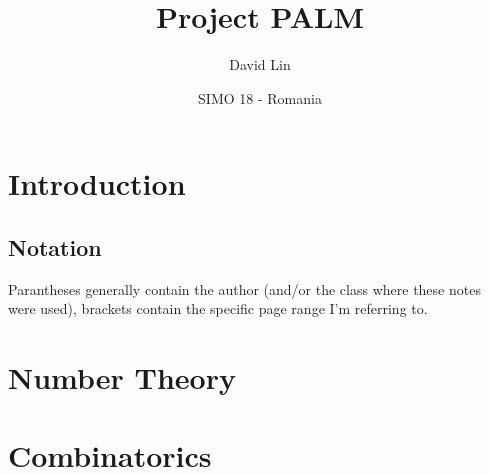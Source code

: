 \documentclass[a4paper]{article}
\begin{document}
%
\title{Project PALM}
\author{David Lin}
\date{SIMO 18 - Romania}
\maketitle
\section{Introduction}
\subsection{Notation}
Parantheses generally contain the author (and/or the class where these notes were used), brackets contain the specific page range I'm referring to.
\newpage


\section{Number Theory}
\section{Combinatorics}
\end{document}
